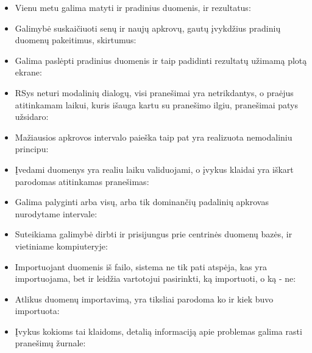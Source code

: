 \begin{itemize}
  \item Vienu metu galima matyti ir pradinius duomenis, ir rezultatus:

  \item Galimybė suskaičiuoti senų ir naujų apkrovų, gautų įvykdžius pradinių
  duomenų pakeitimus, skirtumus:

  \item Galima paslėpti pradinius duomenis ir taip padidinti rezultatų užimamą
  plotą ekrane:

  \item RSys neturi modalinių dialogų, visi pranešimai yra netrikdantys, o praėjus
  atitinkamam laikui, kuris išauga kartu su pranešimo ilgiu, pranešimai patys užsidaro:

  \item Mažiausios apkrovos intervalo paieška taip pat yra realizuota nemodaliniu principu:

  \item Įvedami duomenys yra realiu laiku validuojami, o įvykus klaidai yra iškart parodomas
  atitinkamas pranešimas:

  \item Galima palyginti arba visų, arba tik dominančių padalinių apkrovas nurodytame intervale:

  \item Suteikiama galimybė dirbti ir prisijungus prie centrinės duomenų bazės, ir vietiniame
  kompiuteryje:

  \item Importuojant duomenis iš failo, sistema ne tik pati atspėja, kas yra importuojama,
  bet ir leidžia vartotojui pasirinkti, ką importuoti, o ką - ne:

  \item Atlikus duomenų importavimą, yra tiksliai parodoma ko ir kiek buvo importuota:

  \item Įvykus kokioms tai klaidoms, detalią informaciją apie problemas galima rasti
  pranešimų žurnale:
\end{itemize}